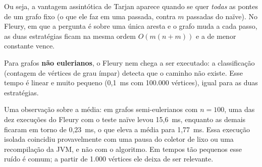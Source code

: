Ou seja, a vantagem assintótica de Tarjan aparece quando se quer \emph{todas} as pontes de um grafo fixo
(o que ele faz em uma passada, contra $m$ passadas do naïve). No Fleury, em que a pergunta é sobre uma
única aresta e o grafo muda a cada passo, as duas estratégias ficam na mesma ordem $O(m(n+m))$ e a de
menor constante vence.

Para grafos \textbf{não eulerianos}, o Fleury nem chega a ser executado: a classificação (contagem de
vértices de grau ímpar) detecta que o caminho não existe. Esse tempo é linear e muito pequeno
(0,1~ms com 100.000 vértices), igual para as duas estratégias.

Uma observação sobre a média: em grafos semi-eulerianos com $n=100$, uma das dez execuções do Fleury
com o teste naïve levou 15,6~ms, enquanto as demais ficaram em torno de 0,23~ms, o que eleva a média
para 1,77~ms. Essa execução isolada coincidiu provavelmente com uma pausa do coletor de lixo ou uma
recompilação da JVM, e não com o algoritmo. Em tempos tão pequenos esse ruído é comum; a partir de
1.000 vértices ele deixa de ser relevante.
